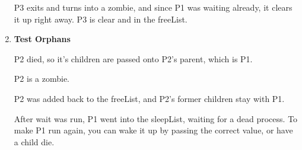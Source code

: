 \documentclass{article}
\begin{document}
\begin{enumerate}
    P3 exits and turns into a zombie, and since P1 was waiting already, it clears it up right away. P3 is clear and in the freeList.
    \item \textbf{Test Orphans}

    P2 died, so it's children are passed onto P2's parent, which is P1.

    P2 is a zombie.

    P2 was added back to the freeList, and P2's former children stay with P1.

    After wait was run, P1 went into the sleepList, waiting for a dead process.
    To make P1 run again, you can wake it up by passing the correct value, or have a child die.

\end{enumerate}
\end{document}
